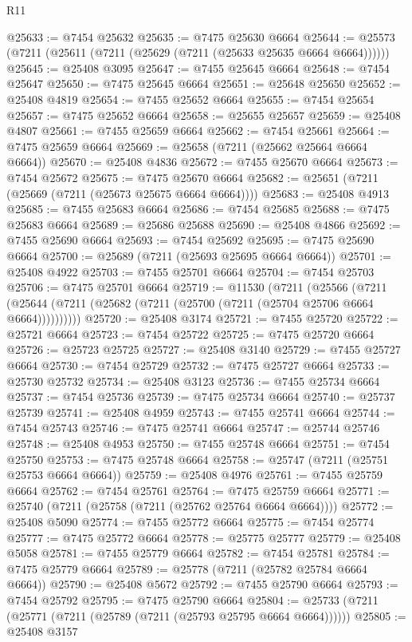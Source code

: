 \begin{lexlean}{R11}
\begin{coremodule}
@25633 := @7454 @25632
@25635 := @7475 @25630 @6664
@25644 := @25573 (@7211 (@25611 (@7211 (@25629 (@7211 (@25633 @25635 @6664 @6664))))))
@25645 := @25408 @3095
@25647 := @7455 @25645 @6664
@25648 := @7454 @25647
@25650 := @7475 @25645 @6664
@25651 := @25648 @25650
@25652 := @25408 @4819
@25654 := @7455 @25652 @6664
@25655 := @7454 @25654
@25657 := @7475 @25652 @6664
@25658 := @25655 @25657
@25659 := @25408 @4807
@25661 := @7455 @25659 @6664
@25662 := @7454 @25661
@25664 := @7475 @25659 @6664
@25669 := @25658 (@7211 (@25662 @25664 @6664 @6664))
@25670 := @25408 @4836
@25672 := @7455 @25670 @6664
@25673 := @7454 @25672
@25675 := @7475 @25670 @6664
@25682 := @25651 (@7211 (@25669 (@7211 (@25673 @25675 @6664 @6664))))
@25683 := @25408 @4913
@25685 := @7455 @25683 @6664
@25686 := @7454 @25685
@25688 := @7475 @25683 @6664
@25689 := @25686 @25688
@25690 := @25408 @4866
@25692 := @7455 @25690 @6664
@25693 := @7454 @25692
@25695 := @7475 @25690 @6664
@25700 := @25689 (@7211 (@25693 @25695 @6664 @6664))
@25701 := @25408 @4922
@25703 := @7455 @25701 @6664
@25704 := @7454 @25703
@25706 := @7475 @25701 @6664
@25719 := @11530
    (@7211
      (@25566
        (@7211 (@25644 (@7211 (@25682 (@7211 (@25700 (@7211 (@25704 @25706 @6664 @6664))))))))))
@25720 := @25408 @3174
@25721 := @7455 @25720
@25722 := @25721 @6664
@25723 := @7454 @25722
@25725 := @7475 @25720 @6664
@25726 := @25723 @25725
@25727 := @25408 @3140
@25729 := @7455 @25727 @6664
@25730 := @7454 @25729
@25732 := @7475 @25727 @6664
@25733 := @25730 @25732
@25734 := @25408 @3123
@25736 := @7455 @25734 @6664
@25737 := @7454 @25736
@25739 := @7475 @25734 @6664
@25740 := @25737 @25739
@25741 := @25408 @4959
@25743 := @7455 @25741 @6664
@25744 := @7454 @25743
@25746 := @7475 @25741 @6664
@25747 := @25744 @25746
@25748 := @25408 @4953
@25750 := @7455 @25748 @6664
@25751 := @7454 @25750
@25753 := @7475 @25748 @6664
@25758 := @25747 (@7211 (@25751 @25753 @6664 @6664))
@25759 := @25408 @4976
@25761 := @7455 @25759 @6664
@25762 := @7454 @25761
@25764 := @7475 @25759 @6664
@25771 := @25740 (@7211 (@25758 (@7211 (@25762 @25764 @6664 @6664))))
@25772 := @25408 @5090
@25774 := @7455 @25772 @6664
@25775 := @7454 @25774
@25777 := @7475 @25772 @6664
@25778 := @25775 @25777
@25779 := @25408 @5058
@25781 := @7455 @25779 @6664
@25782 := @7454 @25781
@25784 := @7475 @25779 @6664
@25789 := @25778 (@7211 (@25782 @25784 @6664 @6664))
@25790 := @25408 @5672
@25792 := @7455 @25790 @6664
@25793 := @7454 @25792
@25795 := @7475 @25790 @6664
@25804 := @25733 (@7211 (@25771 (@7211 (@25789 (@7211 (@25793 @25795 @6664 @6664))))))
@25805 := @25408 @3157

\end{coremodule}
\end{lexlean}
